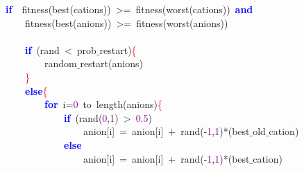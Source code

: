 \noindent
\mbox{}\textbf{\textcolor{Blue}{if}}\ \ fitness\textcolor{BrickRed}{(}best\textcolor{BrickRed}{(}cations\textcolor{BrickRed}{))}\ \textcolor{BrickRed}{\textgreater{}=}\ fitness\textcolor{BrickRed}{(}worst\textcolor{BrickRed}{(}cations\textcolor{BrickRed}{))}\ \textbf{\textcolor{Blue}{and}} \\
\mbox{}\ \ \ \ fitness\textcolor{BrickRed}{(}best\textcolor{BrickRed}{(}anions\textcolor{BrickRed}{))}\ \textcolor{BrickRed}{\textgreater{}=}\ fitness\textcolor{BrickRed}{(}worst\textcolor{BrickRed}{(}anions\textcolor{BrickRed}{))} \\
\mbox{} \\
\mbox{}\ \ \ \ \textbf{\textcolor{Blue}{if}}\ \textcolor{BrickRed}{(}rand\ \textcolor{BrickRed}{\textless{}}\ prob$\_$restart\textcolor{BrickRed}{)}\textcolor{Red}{\{} \\
\mbox{}\ \ \ \ \ \ \ \ random$\_$restart\textcolor{BrickRed}{(}anions\textcolor{BrickRed}{)} \\
\mbox{}\ \ \ \ \textcolor{Red}{\}} \\
\mbox{}\ \ \ \ \textbf{\textcolor{Blue}{else}}\textcolor{Red}{\{} \\
\mbox{}\ \ \ \ \ \ \ \ \textbf{\textcolor{Blue}{for}}\ i\textcolor{BrickRed}{=}\textcolor{Purple}{0}\ to\ length\textcolor{BrickRed}{(}anions\textcolor{BrickRed}{)}\textcolor{Red}{\{} \\
\mbox{}\ \ \ \ \ \ \ \ \ \ \ \ \textbf{\textcolor{Blue}{if}}\ \textcolor{BrickRed}{(}rand\textcolor{BrickRed}{(}\textcolor{Purple}{0}\textcolor{BrickRed}{,}\textcolor{Purple}{1}\textcolor{BrickRed}{)}\ \textcolor{BrickRed}{\textgreater{}}\ \textcolor{Purple}{0.5}\textcolor{BrickRed}{)} \\
\mbox{}\ \ \ \ \ \ \ \ \ \ \ \ \ \ \ \ anion\textcolor{BrickRed}{[}i\textcolor{BrickRed}{]}\ \textcolor{BrickRed}{=}\ anion\textcolor{BrickRed}{[}i\textcolor{BrickRed}{]}\ \textcolor{BrickRed}{+}\ rand\textcolor{BrickRed}{(-}\textcolor{Purple}{1}\textcolor{BrickRed}{,}\textcolor{Purple}{1}\textcolor{BrickRed}{)*(}best$\_$old$\_$cation\textcolor{BrickRed}{)} \\
\mbox{}\ \ \ \ \ \ \ \ \ \ \ \ \textbf{\textcolor{Blue}{else}} \\
\mbox{}\ \ \ \ \ \ \ \ \ \ \ \ \ \ \ \ anion\textcolor{BrickRed}{[}i\textcolor{BrickRed}{]}\ \textcolor{BrickRed}{=}\ anion\textcolor{BrickRed}{[}i\textcolor{BrickRed}{]}\ \textcolor{BrickRed}{+}\ rand\textcolor{BrickRed}{(-}\textcolor{Purple}{1}\textcolor{BrickRed}{,}\textcolor{Purple}{1}\textcolor{BrickRed}{)*(}best$\_$cation\textcolor{BrickRed}{)} \\
